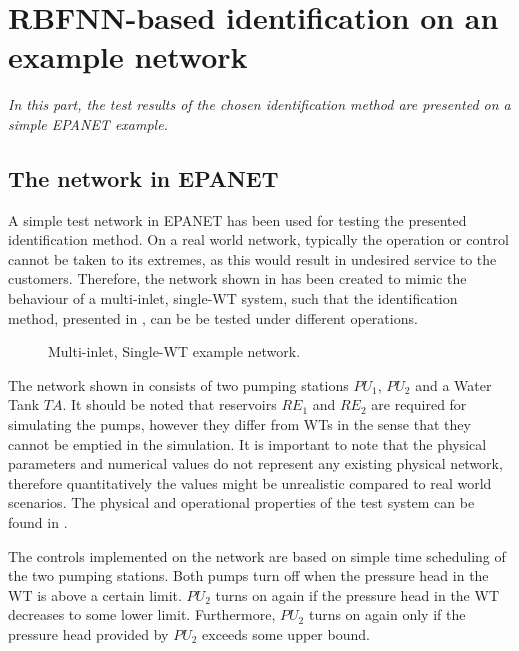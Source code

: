 \chapter{RBFNN-based identification on an example network}
\label{NN_based_example}

\emph{In this part, the test results of the chosen identification method are presented on a simple EPANET example. }

\section{The network in EPANET}
\label{example1_EPANET}

A simple test network in EPANET has been used for testing the presented identification method. On a real world network, typically the operation or control cannot be taken to its extremes, as this would result in undesired service to the customers. Therefore, the network shown in  has been created to mimic the behaviour of a multi-inlet, single-WT system, such that the identification method, presented in , can be be tested under different operations. 

\begin{figure}[H]
\centering
 
\caption{Multi-inlet, Single-WT example network.}
\label{fig:epanet_example1_id}
\end{figure}
\vspace{-3mm}

The network shown in  consists of two pumping stations $PU_1$, $PU_2$ and a Water Tank $TA$. It should be noted that reservoirs $RE_1$ and $RE_2$ are required for simulating the pumps, however they differ from WTs in the sense that they cannot be emptied in the simulation. It is important to note that the physical parameters and numerical values do not represent any existing physical network, therefore quantitatively the values might be unrealistic compared to real world scenarios. The physical and operational properties of the test system can be found in .

The controls implemented on the network are based on simple time scheduling of the two pumping stations. Both pumps turn off when the pressure head in the WT is above a certain limit. $PU_2$ turns on again if the pressure head in the WT decreases to some lower limit. Furthermore, $PU_2$ turns on again only if the pressure head provided by $PU_2$ exceeds some upper bound. 

